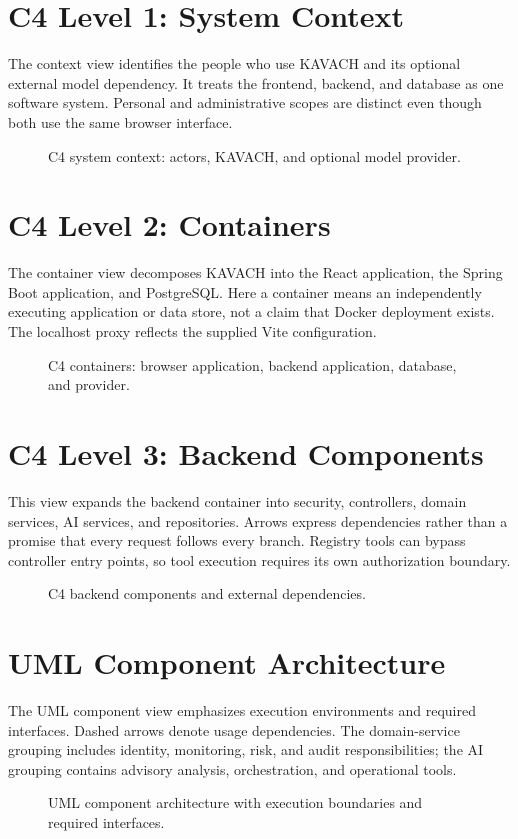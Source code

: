 \newsavebox{\KDiagramRaw}
\newsavebox{\KDiagramScaled}
\newcommand{\diagramview}[4]{%
\clearpage\section{#1}
#2
\legendline
\begin{figure}[!ht]\centering
\sbox{\KDiagramRaw}{}
\ifdim\wd\KDiagramRaw>\textwidth
 \sbox{\KDiagramScaled}{\resizebox{\textwidth}{!}{\usebox{\KDiagramRaw}}}
\else\sbox{\KDiagramScaled}{\usebox{\KDiagramRaw}}\fi
\ifdim\dimexpr\ht\KDiagramScaled+\dp\KDiagramScaled\relax>16cm
 \resizebox*{!}{16cm}{\usebox{\KDiagramScaled}}
\else\usebox{\KDiagramScaled}\fi
\caption{#4}\end{figure}}

\diagramview{C4 Level 1: System Context}{The context view identifies the people who use KAVACH and its optional external model dependency. It treats the frontend, backend, and database as one software system. Personal and administrative scopes are distinct even though both use the same browser interface.}{c4-context}{C4 system context: actors, KAVACH, and optional model provider.}

\diagramview{C4 Level 2: Containers}{The container view decomposes KAVACH into the React application, the Spring Boot application, and PostgreSQL. Here a container means an independently executing application or data store, not a claim that Docker deployment exists. The localhost proxy reflects the supplied Vite configuration.}{c4-containers}{C4 containers: browser application, backend application, database, and provider.}

\diagramview{C4 Level 3: Backend Components}{This view expands the backend container into security, controllers, domain services, AI services, and repositories. Arrows express dependencies rather than a promise that every request follows every branch. Registry tools can bypass controller entry points, so tool execution requires its own authorization boundary.}{c4-components}{C4 backend components and external dependencies.}

\diagramview{UML Component Architecture}{The UML component view emphasizes execution environments and required interfaces. Dashed arrows denote usage dependencies. The domain-service grouping includes identity, monitoring, risk, and audit responsibilities; the AI grouping contains advisory analysis, orchestration, and operational tools.}{uml-architecture}{UML component architecture with execution boundaries and required interfaces.}


